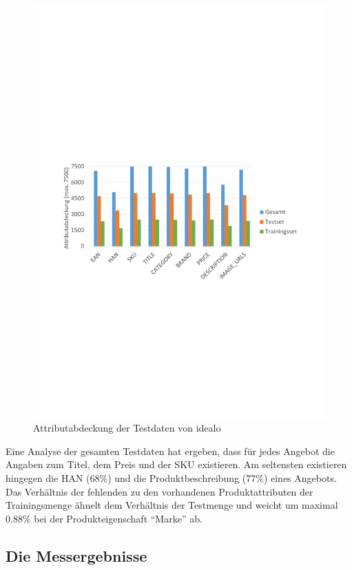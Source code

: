 \begin{figure}[h]
    \centering
    \includegraphics[width=0.9 \textwidth, trim=0 10.05cm 0 11.4cm, clip]{resources/Testdaten-Attributverteilung.pdf}
    \caption{Attributabdeckung der Testdaten von idealo}
    \label{abb:testdaten}
    \vspace{-0.25cm}
\end{figure}

Eine Analyse der gesamten Testdaten hat ergeben, dass für jedes Angebot die Angaben zum Titel, dem Preis und der SKU
existieren.
Am seltensten existieren hingegen die HAN (68\%) und die Produktbeschreibung (77\%) eines Angebots.
Das Verhältnis der fehlenden zu den vorhandenen Produktattributen der Trainingsmenge ähnelt dem Verhältnis der
Testmenge und weicht um maximal 0.88\% bei der Produkteigenschaft ``Marke'' ab.

\subsection{Die Messergebnisse}
\label{subsec:genauigkeitsmessung}

